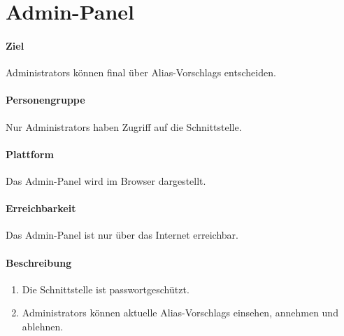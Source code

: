 \newpage
\section{Admin-Panel}
\label{Admin-Panel}
\paragraph{Ziel}
\Glspl{Administrator} können final über \Glspl{Alias-Vorschlag} entscheiden.
\paragraph{Personengruppe}
Nur \Glspl{Administrator} haben Zugriff auf die \Gls{Schnittstelle}.
\paragraph{Plattform}
Das \Gls{Admin-Panel} wird im \Gls{Browser} dargestellt.
\paragraph{Erreichbarkeit}
Das \Gls{Admin-Panel} ist nur über das Internet erreichbar. 

\paragraph{Beschreibung}
\begin{enumerate}
    \item Die \Gls{Schnittstelle} ist passwortgeschützt.
    \item \Glspl{Administrator} können aktuelle \Glspl{Alias-Vorschlag} einsehen, annehmen und ablehnen.
\end{enumerate}
